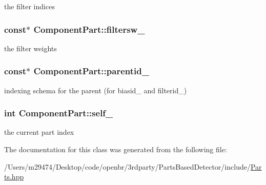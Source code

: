 the filter indices 

\hypertarget{class_component_part_a301c8633b1e8db3f30436c0ba0fc140d}{
\subsubsection[{filtersw\-\_\-}]{ const$\ast$ Component\-Part\-::filtersw\-\_\-\hspace{0.3cm}{\ttfamily [private]}}}\label{class_component_part_a301c8633b1e8db3f30436c0ba0fc140d}


the filter weights 

\hypertarget{class_component_part_a3c75a843f04e4b3d56e4461f8ef803fa}{
\subsubsection[{parentid\-\_\-}]{ const$\ast$ Component\-Part\-::parentid\-\_\-\hspace{0.3cm}{\ttfamily [private]}}}\label{class_component_part_a3c75a843f04e4b3d56e4461f8ef803fa}


indexing schema for the parent (for biasid\-\_\- and filterid\-\_\-) 

\hypertarget{class_component_part_a814391cfc1e60223f270d06e3bf2f8b6}{
\subsubsection[{self\-\_\-}]{\setlength{\rightskip}{0pt plus 5cm}int Component\-Part\-::self\-\_\-\hspace{0.3cm}{\ttfamily [private]}}}\label{class_component_part_a814391cfc1e60223f270d06e3bf2f8b6}


the current part index 



The documentation for this class was generated from the following file\-:\begin{DoxyCompactItemize}
\item 
/\-Users/m29474/\-Desktop/code/openbr/3rdparty/\-Parts\-Based\-Detector/include/\hyperlink{_parts_8hpp}{Parts.\-hpp}\end{DoxyCompactItemize}
